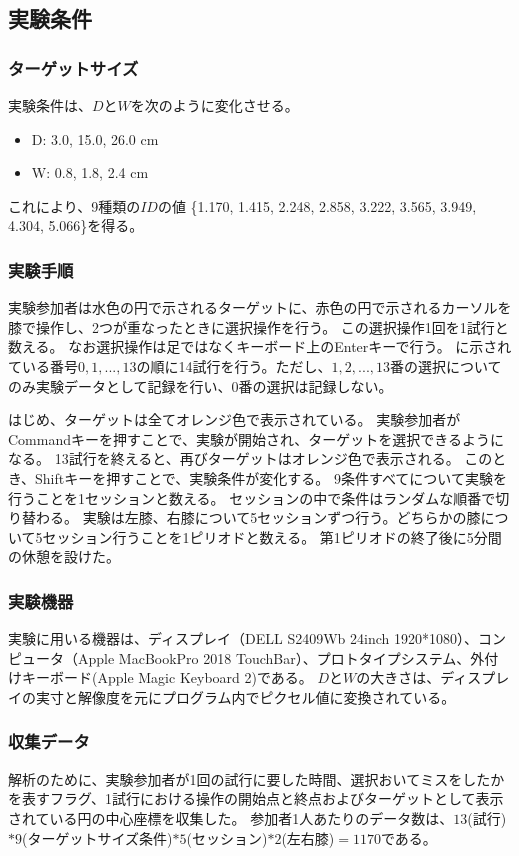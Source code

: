\documentclass[submit, techrep]{ipsj}
\begin{document}
\subsection{実験条件}
\subsubsection{ターゲットサイズ}
実験条件は、$D$と$W$を次のように変化させる。
\begin{itemize}
	\item {D: } 3.0, 15.0, 26.0 \si{cm}
	\item {W: } 0.8, 1.8, 2.4 \si{cm}
\end{itemize}
これにより、9種類の$ID$の値 \{1.170, 1.415, 2.248, 2.858, 3.222, 3.565, 3.949, 4.304, 5.066\}を得る。

\subsubsection{実験手順}
実験参加者は水色の円で示されるターゲットに、赤色の円で示されるカーソルを膝で操作し、2つが重なったときに選択操作を行う。
この選択操作1回を1試行と数える。
なお選択操作は足ではなくキーボード上のEnterキーで行う。
に示されている番号$0,1,...,13$の順に14試行を行う。ただし、$1,2,...,13$番の選択についてのみ実験データとして記録を行い、$0$番の選択は記録しない。\par
はじめ、ターゲットは全てオレンジ色で表示されている。
実験参加者がCommandキーを押すことで、実験が開始され、ターゲットを選択できるようになる。
13試行を終えると、再びターゲットはオレンジ色で表示される。
このとき、Shiftキーを押すことで、実験条件が変化する。
9条件すべてについて実験を行うことを1セッションと数える。
セッションの中で条件はランダムな順番で切り替わる。
実験は左膝、右膝について5セッションずつ行う。どちらかの膝について5セッション行うことを1ピリオドと数える。
第1ピリオドの終了後に5分間の休憩を設けた。
\subsubsection{実験機器}
実験に用いる機器は、ディスプレイ（DELL S2409Wb 24inch 1920*1080）、コンピュータ（Apple MacBookPro 2018 TouchBar）、プロトタイプシステム、外付けキーボード(Apple Magic Keyboard 2)である。
$D$と$W$の大きさは、ディスプレイの実寸と解像度を元にプログラム内でピクセル値に変換されている。
\subsubsection{収集データ}
解析のために、実験参加者が1回の試行に要した時間、選択おいてミスをしたかを表すフラグ、1試行における操作の開始点と終点およびターゲットとして表示されている円の中心座標を収集した。
参加者1人あたりのデータ数は、$13$(試行)$*9$(ターゲットサイズ条件)$*5$(セッション)$*2$(左右膝)$ = 1170$である。
\end{document}
